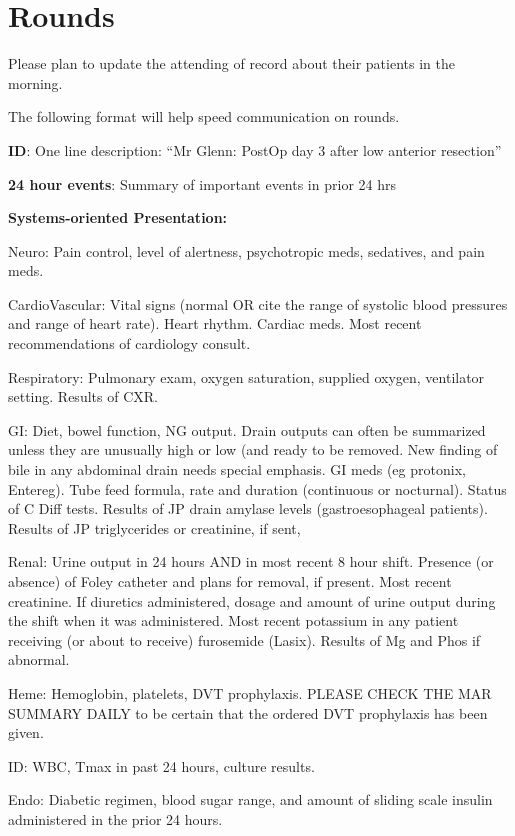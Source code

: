 \documentclass[
]{book}
\begin{document}
\hypertarget{rounds-1}{%
\chapter{Rounds}\label{rounds-1}}

Please plan to update the attending of record about their patients in the morning.

The following format will help speed communication on rounds.

\textbf{ID}: One line description: ``Mr Glenn: PostOp day 3 after low anterior resection''

\textbf{24 hour events}: Summary of important events in prior 24 hrs

\textbf{Systems-oriented Presentation:}

Neuro: Pain control, level of alertness, psychotropic meds, sedatives, and pain meds.

CardioVascular: Vital signs (normal OR cite the range of systolic blood pressures and range of heart rate). Heart rhythm. Cardiac meds. Most recent recommendations of cardiology consult.

Respiratory: Pulmonary exam, oxygen saturation, supplied oxygen, ventilator setting. Results of CXR.

GI: Diet, bowel function, NG output. Drain outputs can often be summarized unless they are unusually high or low (and ready to be removed. New finding of bile in any abdominal drain needs special emphasis. GI meds (eg protonix, Entereg). Tube feed formula, rate and duration (continuous or nocturnal). Status of C Diff tests. Results of JP drain amylase levels (gastroesophageal patients). Results of JP triglycerides or creatinine, if sent,

Renal: Urine output in 24 hours AND in most recent 8 hour shift. Presence (or absence) of Foley catheter and plans for removal, if present. Most recent creatinine. If diuretics administered, dosage and amount of urine output during the shift when it was administered. Most recent potassium in any patient receiving (or about to receive) furosemide (Lasix). Results of Mg and Phos if abnormal.

Heme: Hemoglobin, platelets, DVT prophylaxis. PLEASE CHECK THE MAR SUMMARY DAILY to be certain that the ordered DVT prophylaxis has been given.

ID: WBC, Tmax in past 24 hours, culture results.

Endo: Diabetic regimen, blood sugar range, and amount of sliding scale insulin administered in the prior 24 hours.
\end{document}
